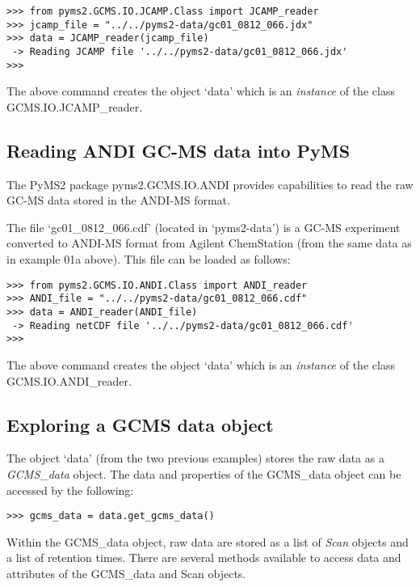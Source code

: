\begin{verbatim}
>>> from pyms2.GCMS.IO.JCAMP.Class import JCAMP_reader
>>> jcamp_file = "../../pyms2-data/gc01_0812_066.jdx"
>>> data = JCAMP_reader(jcamp_file)
 -> Reading JCAMP file '../../pyms2-data/gc01_0812_066.jdx'
>>>
\end{verbatim}

\noindent
The above command creates the object `data' which is an {\em instance}
of the class GCMS.IO.JCAMP\_reader.

\subsection{Reading ANDI GC-MS data into PyMS}


The PyMS2 package pyms2.GCMS.IO.ANDI provides capabilities to read the raw
GC-MS data stored in the ANDI-MS format.

The file `gc01\_0812\_066.cdf' (located in `pyms2-data') is a GC-MS experiment
converted to ANDI-MS format from Agilent ChemStation (from the same data as in
example 01a above). This file can be loaded as follows:

\begin{verbatim}
>>> from pyms2.GCMS.IO.ANDI.Class import ANDI_reader
>>> ANDI_file = "../../pyms2-data/gc01_0812_066.cdf"
>>> data = ANDI_reader(ANDI_file)
 -> Reading netCDF file '../../pyms2-data/gc01_0812_066.cdf'
>>>
\end{verbatim}

\noindent
The above command creates the object `data' which is an {\em instance}
of the class GCMS.IO.ANDI\_reader.

\subsection{Exploring a GCMS data object}


The object `data' (from the two previous examples) stores the raw data as a {\em
GCMS\_data} object. The data and properties of the GCMS\_data object can be
accessed by the following:

\begin{verbatim}
>>> gcms_data = data.get_gcms_data()
\end{verbatim}

Within the GCMS\_data object, raw data are stored as a list of {\em Scan}
objects and a list of retention times.  There are several methods available to
access data and attributes of the GCMS\_data and Scan objects.

